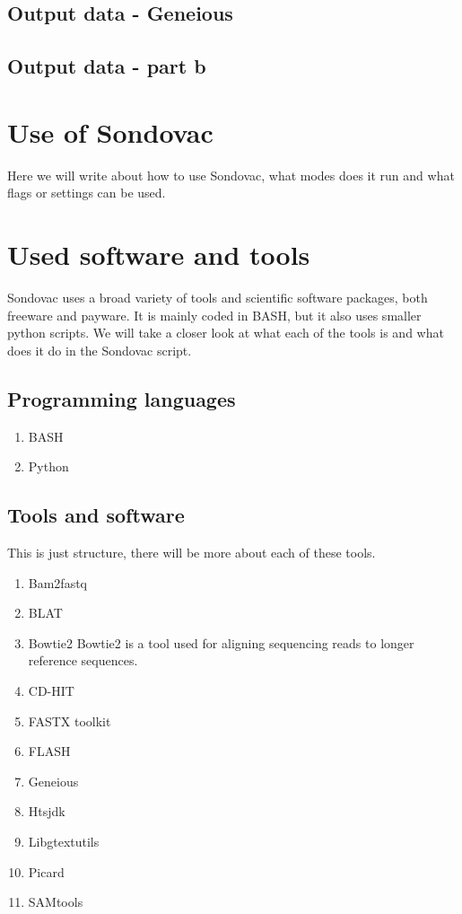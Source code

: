 \subsection{Output data - Geneious}


\subsection{Output data - part b}


\section{Use of Sondovac}
Here we will write about how to use Sondovac, what modes does it run and what flags or settings can be used. 
\section{Used software and tools}

Sondovac uses a broad variety of tools and scientific software packages, both freeware and payware. It is mainly coded in BASH, but it also uses smaller python 
scripts. We will take a closer look at what each of the tools is and what does it do in the Sondovac script. 

\subsection{Programming languages}
\begin{enumerate}
\item BASH
\item Python
\end{enumerate}

\subsection{Tools and software}

This is just structure, there will be more about each of these tools. 

\begin{enumerate}
\item Bam2fastq
\item BLAT
\item Bowtie2
Bowtie2 is a tool used for aligning sequencing reads to longer reference sequences. \cite{bowtie2}
\item CD-HIT
\item FASTX toolkit
\item FLASH
\item Geneious
\item Htsjdk
\item Libgtextutils
\item Picard
\item SAMtools
\end{enumerate}

